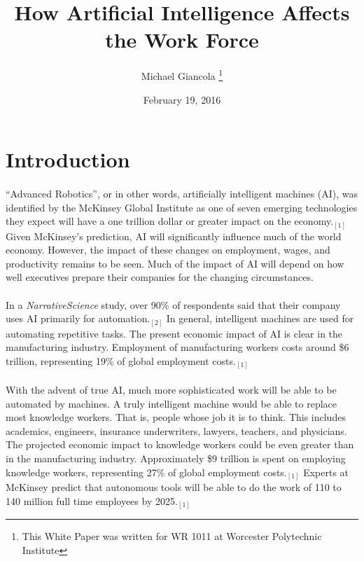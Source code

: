 \documentclass{article}
\begin{document}
  \renewcommand\footnotemark{}
  \title{How Artificial Intelligence Affects the Work Force}
  \author{Michael Giancola \thanks{This White Paper was written for WR 1011 at Worcester Polytechnic Institute}}
  \date{February 19, 2016}
  \maketitle

  \cleardoublepage


  \section{Introduction}
    \paragraph{}
      ``Advanced Robotics'', or in other words, artificially intelligent machines (AI),
      was identified by the McKinsey Global Institute as one of seven emerging
      technologies they expect will have a one trillion dollar or greater impact on the economy.$_{[1]}$
      Given McKinsey's prediction, AI will significantly influence much of the
      world economy. However, the impact of these changes on employment, wages,
      and productivity remains to be seen.
      Much of the impact of AI will depend on how well executives
      prepare their companies for the changing circumstances.

    \paragraph{}
      In a \textit{NarrativeScience} study, over 90\% of respondents said that
      their company uses AI primarily for automation.$_{[2]}$ In general, intelligent
      machines are used for automating repetitive tasks.
      The present economic impact of AI is clear in the manufacturing
      industry. Employment of manufacturing workers costs around \$6
      trillion, representing 19\% of global employment costs.$_{[1]}$

    \paragraph{}
      With the advent of true AI, much more sophisticated work will be able to
      be automated by machines. A truly intelligent machine would be able to
      replace most knowledge workers. That is, people whose job it is to think.
      This includes academics, engineers, insurance underwriters, lawyers, teachers,
      and physicians.
      The projected economic impact to knowledge workers could be even greater than
      in the manufacturing industry. Approximately \$9 trillion is spent on employing
      knowledge workers, representing 27\% of global employment costs.$_{[1]}$
      Experts at McKinsey predict that autonomous tools will be able to do the
      work of 110 to 140 million full time employees by 2025.$_{[1]}$
\end{document}
